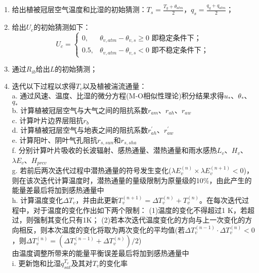 \begin{enumerate}
    \item 给出植被冠层空气温度和比湿的初始猜测：$T_s=\frac{T_g+\theta_{atm}}{2}$，$q_s=\frac{q_g+q_{atm}}{2}$；
    \item 给出$U_c$的初始猜测如下：\\
    \begin{equation*}
    U_c= \begin{cases}
      0,  & \theta_{v,atm}-\theta_{v,s}\geq0 \text{ 即稳定条件下；} \\
      0.5, & \theta_{v,atm}-\theta_{v,s}<0 \text{ 即不稳定条件下；}
     \end{cases}
    \end{equation*}
    \item 通过$R_{ib}$给出$L$的初始猜测；
    \item 迭代以下过程以求得$T_v$以及植被湍流通量：\\
    a. 通过风速、温度、比湿的微分方程(M-O相似性理论)积分结果求得$u_\ast$、$\theta_\ast$、$q_\ast$ \\
    b. 计算植被冠层空气与大气之间的阻抗系数$r_{am}$、$r_{ah}$、$r_{aw}$ \\
    c. 计算叶片边界层阻抗$r_b$ \\
    d. 计算植被冠层空气与地表之间的阻抗系数$r_{ah}^\prime$、$r_{aw}^\prime$ \\
    e. 计算阳叶、阴叶气孔阻抗$r_{s,sun}$和$r_{s,sha}$ \\
    f. 分别计算叶片吸收的长波辐射、感热通量、潜热通量和雨水感热$L_v$、$H_{v}$、$\lambda E_{v}$、$H_{prcv}$ \\
    g. 若前后两次迭代过程中潜热通量的符号发生变化($\lambda E_{v}^{\left(n\right)}\times\lambda E_{v}^{\left(n+1\right)}<0$)，
    则在该次迭代计算温度时，潜热通量的量级限制为原量级的10\%，由此产生的能量差最后将加到感热通量中 \\
    h. 计算温度变化$\Delta T_v$，并由此更新$T_v^{\left(n+1\right)}=\Delta T_v^{\left(n\right)}+T_v^{\left(n\right)}$。在每次迭代过程中，对于温度的变化作出如下两个限制：
    (1)温度的变化不得超过1 K，若超过，则强制其变化只有1K；
    (2)若本次迭代温度变化的方向与上一次变化的方向相反，则本次温度的变化将取为两次变化的平均值(若$\Delta T_v^{\left(n-1\right)} \cdot \Delta T_v^{\left(n\right)}<0$，则$\Delta T_v^{\left(n\right)}=\left(\Delta T_v^{\left(n-1\right)}+\Delta T_v^{\left(n\right)}\right)/2$)\\
    由温度调整所带来的能量平衡误差最后将加到感热通量中\\
    i. 更新饱和比湿$q_{sat}^{T_v}$及其对$T_v$的变化率 \\

\end{enumerate}
